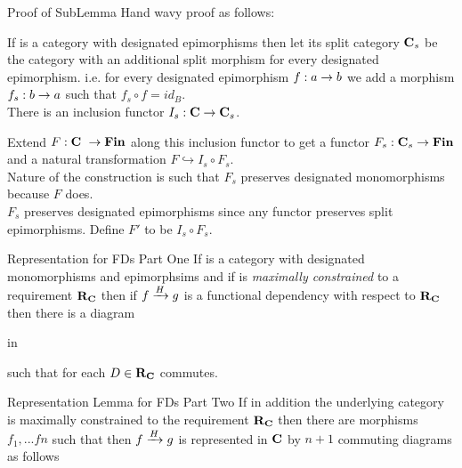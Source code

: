 \begin{frame}{Proof of SubLemma}
Hand wavy proof as follows:

If \catcw is a category with designated epimorphisms then let its split category 
$\catc_s$ be the category \catcw with an additional split morphism for every designated epimorphism.
i.e. for every designated epimorphism $f: a \morph b$ we add a morphism $f_s:b \morph a$
such that $f_s \circ f = id_B$. \\

There is an inclusion functor $I_s:\catc \morph \catc_s$.

Extend $F:\catcw \morph \Fin$ along this inclusion functor  to get a functor 
$F_s:\catc_s \morph \Fin$ and a natural transformation $F \hookrightarrow I_s \circ F_s$. \\
\medskip
Nature of the construction is such that $F_s$ preserves designated monomorphisms because $F$ does.\\
\medskip
$F_s$ preserves designated epimorphisms since any functor preserves split epimorphisms.
Define $F'$ to be $I_s \circ F_s$.
\end{frame}

\begin{frame}{Representation for FDs Part One}{\slidecontext}
If \catcw is a category with designated monomorphisms and epimorphsims  and if \catcw is
\textit{maximally constrained} to a requirement $\reqtc$ then
if $\fundep{H}{f}{g}$  is a functional dependency with respect to $\reqtc$
then there is a diagram\\
\medskip
\begin{minipage}[t][.45cm][t]{5.5cm} %
\scalebox{0.9}{\representationdiagram} 
\hspace*{\fill} in \catc
\end{minipage} 
\pause \begin{minipage}[t]{4.5cm}
such that for each $D \in \reqtc$
\scalebox{0.85}{\mappedrepresentationdiagram}
\hspace*{\fill} commutes.
\end{minipage}
\end{frame}

\begin{frame}{Representation Lemma for FDs Part Two}{\slidecontext}
If in addition the underlying category \catcw is maximally constrained  
 to the requirement $\reqtc$ then
there are morphisms $f_1,...fn$ such that
then $\fundep{H}{f}{g}$ is represented in $\catc$ by  $n+1$ commuting diagrams
as follows
\begin{center}
\scalebox{0.9}{\fullrepresentationdiagram}
\end{center} 
\end{frame}

